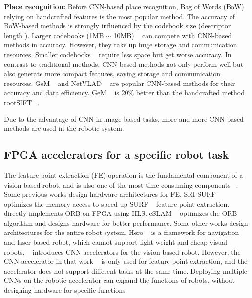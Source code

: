 \textbf{Place recognition:} Before CNN-based place recognition, Bag of Words (BoW)  ~\cite{small_1} relying on handcrafted features is the most popular method. The accuracy of BoW-based methods is strongly influenced by the codebook size (descriptor length ). Larger codebooks (1MB $\sim$ 10MB)  ~\cite{large_1, large_2} can compete with CNN-based methods in accuracy. However, they take up huge storage and communication resources. Smaller codebooks ~\cite{small_1, small_2, jegou2014triang} require less space but get worse accuracy. In contrast to traditional methods, CNN-based methods not only perform well but also generate more compact features, saving storage and communication resources. GeM  ~\cite{radenovic2018fine} and NetVLAD  ~\cite{arandjelovic2016netvlad} are popular CNN-based methods for their accuracy and data efficiency. GeM  ~\cite{radenovic2018fine} is 20\% better than the handcrafted method rootSIFT  ~\cite{jegou2014triang}.

Due to the advantage of CNN in image-based tasks, more and more CNN-based methods are used in the robotic system.


\subsection{ FPGA accelerators for a specific robot task }

The feature-point extraction (FE) operation is the fundamental component of a vision based robot, and is also one of the most time-consuming components  ~\cite{fang2017fpga}.
Some previous works design hardware architectures for FE.
SRI-SURF  ~\cite{jia2016sri} optimizes the memory access to speed up SURF  ~\cite{bay2006surf} feature-point extraction. 
~\cite{fang2017fpga} directly implements ORB on FPGA using HLS. eSLAM ~\cite{liu2019eslam} optimizes the ORB algorithm and designs hardware for better performance.
Some other works design architectures for the entire robot system. Hero  ~\cite{shi2018hero} is a framework for navigation and laser-based robot, which cannot support light-weight and cheap visual robots. 
~\cite{li2019879gops} introduces CNN accelerators for the vision-based robot. 
However, the CNN accelerator in that work ~\cite{li2019879gops} is only used for feature-point extraction, and the accelerator does not support different tasks at the same time. 
Deploying multiple CNNs on the robotic accelerator can expand the functions of robots, without designing hardware for specific functions.



